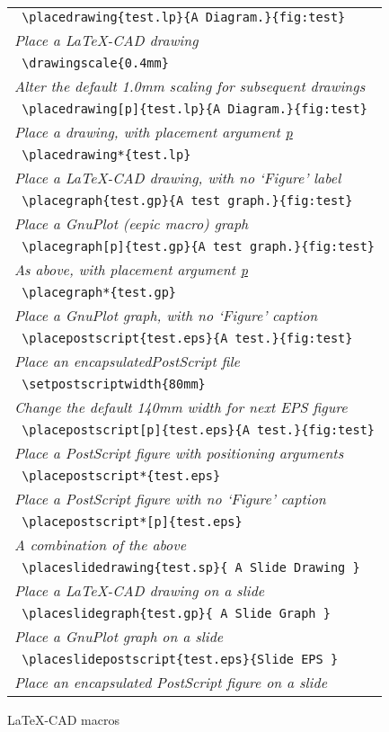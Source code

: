 \documentclass[a4paper]{article}
\begin{document}
\begin{figure}
	\begin{center}
	\begin{tabular}{l}
		\hline
		\verb! \placedrawing{test.lp}{A Diagram.}{fig:test}! \\
			\emph{Place a LaTeX-CAD drawing} \\
			\verb! \drawingscale{0.4mm}! \\
			\emph{Alter the default 1.0mm scaling for subsequent drawings} \\ 
			\verb! \placedrawing[p]{test.lp}{A Diagram.}{fig:test}! \\
			\emph{Place a drawing, with placement argument \underline{p}} \\
			\verb! \placedrawing*{test.lp}! \\
			\emph{Place a LaTeX-CAD drawing, with no `Figure' label} \\
			\verb! \placegraph{test.gp}{A test graph.}{fig:test}! \\
			\emph{Place a GnuPlot (eepic macro) graph} \\
			\verb! \placegraph[p]{test.gp}{A test graph.}{fig:test}! \\
			\emph{As above, with placement argument \underline{p}} \\
			\verb! \placegraph*{test.gp}!   \\
			\emph{Place a GnuPlot graph, with no `Figure' caption} \\
			\verb! \placepostscript{test.eps}{A test.}{fig:test}! \\
			\emph{Place an encapsulatedPostScript file} \\
			\verb! \setpostscriptwidth{80mm}!       \\
			\emph{Change the default 140mm width for next EPS figure }\\
			\verb! \placepostscript[p]{test.eps}{A test.}{fig:test}! \\
			\emph{Place a PostScript figure with positioning arguments} \\
			\verb! \placepostscript*{test.eps}! \\
			\emph{Place a PostScript figure with no `Figure' caption} \\
			\verb! \placepostscript*[p]{test.eps}! \\
			\emph{A combination of the above} \\
			\verb! \placeslidedrawing{test.sp}{ A Slide Drawing }! \\
			\emph{Place a LaTeX-CAD drawing on a slide} \\
			\verb! \placeslidegraph{test.gp}{ A Slide Graph }! \\
			\emph{Place a GnuPlot graph on a slide} \\ 
			\verb! \placeslidepostscript{test.eps}{Slide EPS }! \\
			\emph{Place an encapsulated PostScript figure on a slide} \\
		\hline\hline
	\end{tabular}
	\end{center}
	\caption{LaTeX-CAD macros}
	\label{fig:lcadmacros}
\end{figure}
\end{document}
